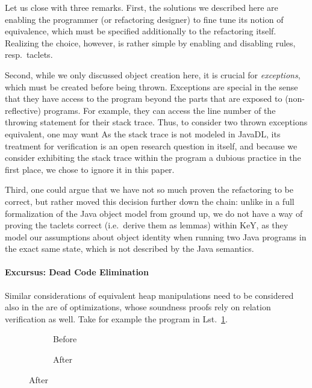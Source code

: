 Let us close with three remarks. First, the solutions we described here are enabling the programmer (or refactoring designer) to fine tune its notion of equivalence, which must be specified additionally to the refactoring itself. Realizing the choice, however, is rather simple by enabling and disabling rules, resp.\ taclets.

Second, while we only discussed object creation here, it is crucial for \emph{exceptions}, which must be created before being thrown. 
Exceptions are special in the sense that they have access to the program beyond the parts that are exposed to (non-reflective) programs.
For example, they can access the line number of the throwing statement for their stack trace. Thus, to consider two thrown exceptions equivalent, 
one may want 
As the stack trace is not modeled in JavaDL, its treatment for verification is an open research question in itself, and because we consider exhibiting the stack trace
within the program a dubious practice in the first place, we chose to ignore it in this paper.

Third, one could argue that we have not so much proven the refactoring to be correct,
but rather moved this decision further down the chain: unlike in a full formalization of the Java object model from ground up, %
we do not have a way of proving the taclets correct (i.e.\ derive them as lemmas) within KeY, as they model our assumptions about object identity when running two Java programs in the exact same state, which is not described by the Java semantics.


\paragraph*{Excursus: Dead Code Elimination}
Similar considerations of equivalent heap manipulations need to be considered also in the are of optimizations, whose soundness proofs rely on relation verification as well.
Take for example the program in Lst.~\ref{lst:xisnewxisnew}.%
\begin{figure}
  \centering
  \begin{subfigure}[b]{.2\linewidth}
    
    \caption{Before}
  \end{subfigure}\hspace{1cm}
  \begin{subfigure}[b]{.2\linewidth}
    
    \caption{After}
  \end{subfigure}
\label{lst:xisnewxisnew}
\end{figure}

